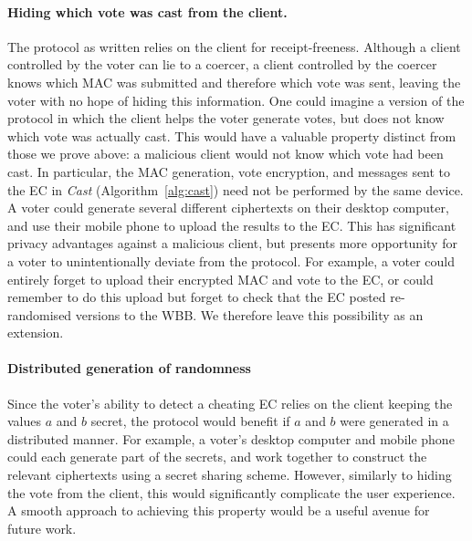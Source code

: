 \documentclass[12pt,a4paper]{article}
\theoremstyle{definition}
\begin{document}
\paragraph{Hiding which vote was cast from the client.}
The protocol as written relies on the client for receipt-freeness. Although a client controlled by the voter can lie to a coercer, a client controlled by the coercer knows which MAC was submitted and therefore which vote was sent, leaving the voter with no hope of hiding this information.
One could imagine a version of the protocol in which the client helps the voter generate votes, but does not know which vote was actually cast. This would have a valuable property distinct from those we prove above: a malicious client would not know which vote had been cast. In particular, the MAC generation, vote encryption, and messages sent to the EC in \textit{Cast} (Algorithm~\ref{alg:cast}) need not be performed by the same device. A voter could generate several different ciphertexts on their desktop computer, and use their mobile phone to upload the results to the EC. 
This has significant privacy advantages against a malicious client, but presents more opportunity for a voter to unintentionally deviate from the protocol. For example, a voter could entirely forget to upload their encrypted MAC and vote to the EC, or could remember to do this upload but forget to check that the EC posted re-randomised versions to the WBB. We therefore leave this possibility as an extension.

\paragraph{Distributed generation of randomness}
Since the voter's ability to detect a cheating EC relies on the client keeping the values $a$ and $b$ secret, the protocol would benefit if $a$ and $b$ were generated in a distributed manner. For example, a voter's desktop computer and mobile phone could each generate part of the secrets, and work together to construct the relevant ciphertexts using a secret sharing scheme. However, similarly to hiding the vote from the client, this would significantly complicate the user experience. A smooth approach to achieving this property would be a useful avenue for future work.
\newpage
\end{document}
